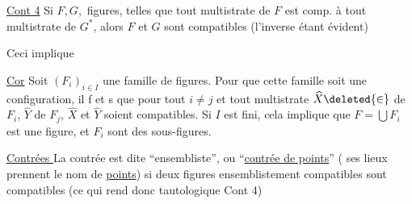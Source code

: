 \uline{Cont 4} Si $F,G,$  figures, telles que tout multistrate de $F$ est comp. à tout multistrate de $G^{*}$, alors $F$ et $G$ sont compatibles (l'inverse étant évident)


\deleted{\uline{Cor} Si $F,G,H$ sont \unsure{. tout|. trois} $(\unsure{F_i|F_j}]$}

 Ceci implique

\uline{Cor} Soit $(F_i)_{i\in I}$ une famille  de figures. Pour que  cette famille soit une configuration, il f et s que pour tout $i\ne j$ et tout multistrate $\widehat{X}\deleted{\in}$ de $F_i$, $\widehat{Y}$ de $F_j$, $\widehat{X}$ et $\widehat{Y}$ soient compatibles. Si $I$ est fini, cela implique que $F=\bigcup F_i$ est une figure, et  $F_i$  sont des sous-figures.


\uline{Contrées } La contrée est dite ``ensembliste'', ou ``\uline{contrée de points}'' ( ses lieux prennent le nom de \uline{points}) si deux figures ensemblistement compatibles sont compatibles (ce qui rend donc tautologique Cont 4) 
